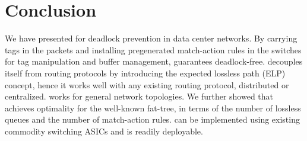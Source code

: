 \section{Conclusion}\label{sec:conclusion}
We have presented \sysname{}  for deadlock prevention in data center
networks. By carrying tags in the packets and installing pregenerated
match-action rules in the switches for tag manipulation and buffer
management, \sysname{}  guarantees deadlock-free. \sysname{} decouples
itself from routing protocols by introducing the expected lossless path
(ELP) concept, hence it works well with any existing routing protocol,
distributed or centralized. \sysname{}  works for general network
topologies. We further showed that \sysname{}  achieves optimality for
the well-known fat-tree, in terms of the number of lossless queues and
the number of match-action rules. \sysname{}  can be implemented using
existing commodity switching ASICs and is readily deployable.
